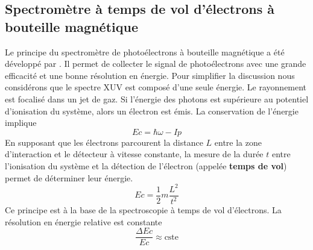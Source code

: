 \subsection{Spectromètre à temps de vol d'électrons à bouteille magnétique}
\label{subsec:TOF}
Le principe du spectromètre de photoélectrons à bouteille magnétique a été développé par . Il permet de collecter le signal de photoélectrons avec une grande efficacité et une bonne résolution en énergie. Pour simplifier la discussion nous considérons que le spectre XUV est composé d'une seule énergie. Le rayonnement est focalisé dans un jet de gaz. Si l'énergie des photons est supérieure au potentiel d'ionisation du système, alors un électron est émis. La conservation de l'énergie implique
\begin{equation}
Ec = \hbar \omega - Ip 
\end{equation}
En supposant que les électrons parcourent la distance $L$ entre la zone d'interaction et le détecteur à vitesse constante, la mesure de la durée $t$ entre l'ionisation du système et la détection de l'électron (appelée \textbf{temps de vol}) permet de déterminer leur énergie.
\begin{equation}
Ec = \frac {1}{2}m \frac{L^2}{t^2}
\end{equation}
Ce principe est à la base de la spectroscopie à temps de vol d'électrons. La résolution en énergie relative est constante
\begin{equation}
\frac{\Delta Ec}{Ec} \approx \text{cste}
\end{equation}
